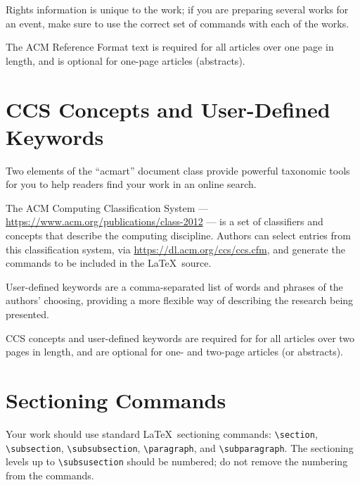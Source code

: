 Rights information is unique to the work; if you are preparing several
works for an event, make sure to use the correct set of commands with
each of the works.

The ACM Reference Format text is required for all articles over one
page in length, and is optional for one-page articles (abstracts).

\section{CCS Concepts and User-Defined Keywords}

Two elements of the ``acmart'' document class provide powerful
taxonomic tools for you to help readers find your work in an online
search.

The ACM Computing Classification System ---
\url{https://www.acm.org/publications/class-2012} --- is a set of
classifiers and concepts that describe the computing
discipline. Authors can select entries from this classification
system, via \url{https://dl.acm.org/ccs/ccs.cfm}, and generate the
commands to be included in the \LaTeX\ source.

User-defined keywords are a comma-separated list of words and phrases
of the authors' choosing, providing a more flexible way of describing
the research being presented.

CCS concepts and user-defined keywords are required for for all
articles over two pages in length, and are optional for one- and
two-page articles (or abstracts).

\section{Sectioning Commands}

Your work should use standard \LaTeX\ sectioning commands:
\verb|\section|, \verb|\subsection|, \verb|\subsubsection|,
\verb|\paragraph|, and \verb|\subparagraph|. The sectioning levels up to
\verb|\subsusection| should be numbered; do not remove the numbering
from the commands.

